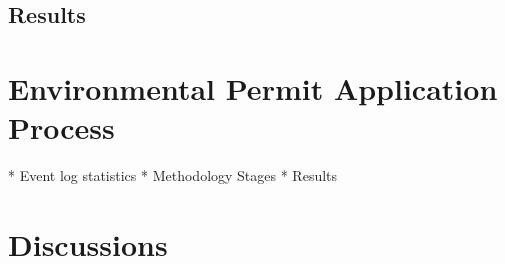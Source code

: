 

\subsection{Results}
\label{sec:loan-app-results}

\section{Environmental Permit Application Process}
\label{sec:environmental-permit-application-process}
 
* Event log statistics
* Methodology Stages
* Results

\section{Discussions}
\label{sec:discussions}